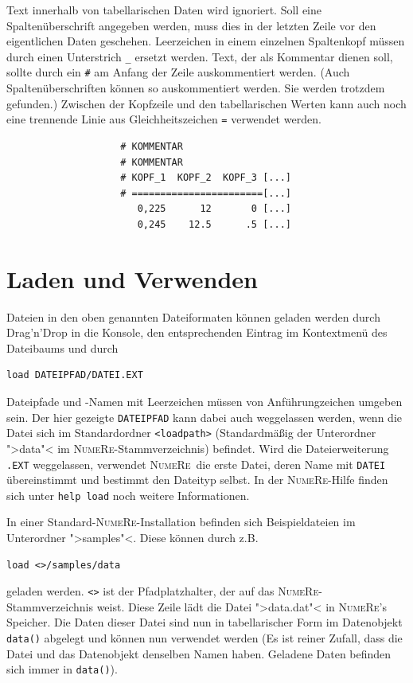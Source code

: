 \documentclass[DIV=14,headsepline,footsepline]{scrbook}
\newcommand{\NR}{\textsc{Nu\-me\-Re}}
\begin{document}
				Text innerhalb von tabellarischen Daten wird ignoriert. Soll eine Spaltenüberschrift angegeben werden, muss dies in der letzten Zeile vor den eigentlichen Daten geschehen. Leerzeichen in einem einzelnen Spaltenkopf müssen durch einen Unterstrich \lstinline+_+ ersetzt werden. Text, der als Kommentar dienen soll, sollte durch ein \lstinline+#+ am Anfang der Zeile auskommentiert werden. (Auch Spaltenüberschriften können so auskommentiert werden. Sie werden trotzdem gefunden.) Zwischen der Kopfzeile und den tabellarischen Werten kann auch noch eine trennende Linie aus Gleichheitszeichen \lstinline+=+ verwendet werden.
				\begin{verbatim}
					# KOMMENTAR
					# KOMMENTAR
					# KOPF_1  KOPF_2  KOPF_3 [...]
					# =======================[...]
					   0,225      12       0 [...]
					   0,245    12.5      .5 [...]
				\end{verbatim}
				
			\section{Laden und Verwenden}
				Dateien in den oben genannten Dateiformaten können geladen werden durch Drag'n'Drop in die Konsole, den entsprechenden Eintrag im Kontextmenü des Dateibaums und durch
				\begin{lstlisting}
load DATEIPFAD/DATEI.EXT
				\end{lstlisting}
				Dateipfade und -Namen mit Leerzeichen müssen von Anführungzeichen umgeben sein. Der hier gezeigte \lstinline+DATEIPFAD+ kann dabei auch weggelassen werden, wenn die Datei sich im Standardordner \lstinline+<loadpath>+ (Standardmäßig der Unterordner ">data"< im \NR-Stammverzeichnis) befindet. Wird die Dateierweiterung \lstinline+.EXT+ weggelassen, verwendet \NR\ die erste Datei, deren Name mit \lstinline+DATEI+ übereinstimmt und bestimmt den Dateityp selbst. In der \NR-Hilfe finden sich unter \lstinline+help load+ noch weitere Informationen.
				
				In einer Standard-\NR-Installation befinden sich Beispieldateien im Unterordner ">samples"<. Diese können durch z.B.
				\begin{lstlisting}
load <>/samples/data
				\end{lstlisting}
				geladen werden. \lstinline+<>+ ist der Pfadplatzhalter, der auf das \NR-Stammverzeichnis weist. Diese Zeile lädt die Datei ">data.dat"< in \NR's Speicher. Die Daten dieser Datei sind nun in tabellarischer Form im Datenobjekt \lstinline+data()+ abgelegt und können nun verwendet werden (Es ist reiner Zufall, dass die Datei und das Datenobjekt denselben Namen haben. Geladene Daten befinden sich immer in \lstinline+data()+).
				
\end{document}
